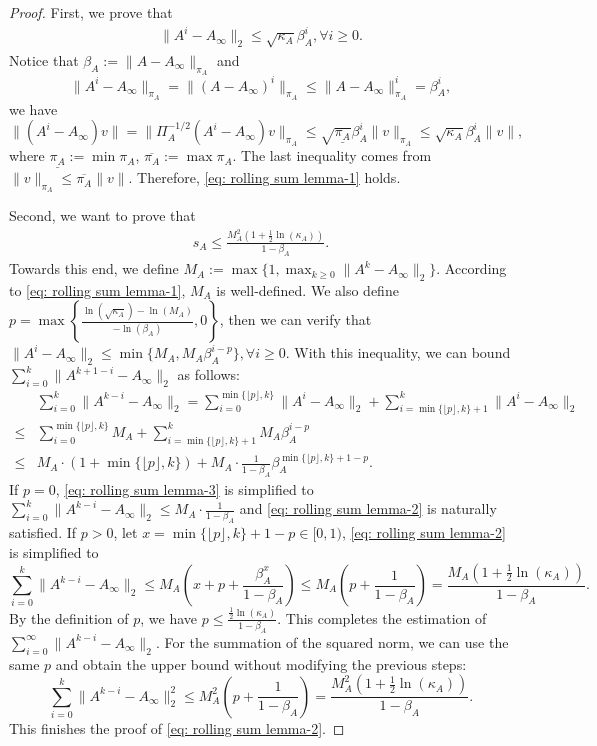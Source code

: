 \documentclass[10pt,a4paper]{amsart}
\newcommand{\norm}[1]{\| #1 \|}
\begin{document}
\begin{proof}
First, we prove that
\begin{align}\label{eq: rolling sum lemma-1}
    \norm{A^i-A_\infty}_2\le \sqrt{\kappa_A}\beta_A^{i}, \forall i \ge 0.
 \end{align}
Notice that $\beta_A:=\norm{A-A_\infty}_{\pi_A}$ and \[\norm{A^i-A_\infty}_{\pi_A}= \norm{(A-A_\infty)^i}_{\pi_A}\le \norm{A-A_\infty}^i_{\pi_A}=\beta_A^i,\]
we have
\[
\norm{(A^{i}-A_\infty)v}=\norm{\Pi_A^{-1/2}(A^i-A_\infty)v}_{\pi_A}\le \sqrt{\underline{\pi_A}}\beta_A^i\norm{v}_{\pi_A}\le \sqrt{\kappa_A}\beta_A^i\norm{v},
\]
where $\underline{\pi_A}:=\min \pi_A$, $\overline{\pi_A}:=\max \pi_A$.
The last inequality comes from $\norm{v}_{\pi_A}\le \overline{\pi_A} \norm{v}$. Therefore, \eqref{eq: rolling sum lemma-1} holds.

Second, we want to prove that
\begin{align}\label{eq: rolling sum lemma-2}
    s_A\le \frac{M_A^2(1+\frac{1}{2}\ln(\kappa_A))}{1-\beta_A}.
\end{align}
Towards this end, we define $M_A:=\max\{1, \max_{k\ge 0}\norm{A^k-A_\infty}_2 \}$. According to \eqref{eq: rolling sum lemma-1}, $M_A$ is well-defined. We also define $p=\max\left\{\frac{\ln(\sqrt{\kappa_A})-\ln(M_A)}{-\ln(\beta_A)}, 0\right\}$,
then we can verify that $\norm{A^i-A_\infty}_2\le \min\{M_A, M_A\beta_A^{i-p}\},\forall i\ge 0.$ With this inequality, we can bound $\sum_{i=0}^k\norm{A^{k+1-i}-A_\infty}_2$ as follows:
\begin{align}\label{eq: rolling sum lemma-3}
    &\sum_{i=0}^k\norm{A^{k-i}-A_\infty}_2=\sum_{i=0}^{\min\{\lfloor p \rfloor, k\}}\norm{A^i-A_\infty}_2+ \sum_{i=\min\{\lfloor p \rfloor, k\}+1}^{k}\norm{A^{i}-A_\infty}_2\\
    \le &\sum_{i=0}^{\min\{\lfloor p \rfloor, k\}} M_A+\sum_{i=\min\{\lfloor p \rfloor, k\}+1}^{k} M_A\beta_A^{i-p}\nonumber\\
    \le & M_A\cdot (1+\min\{\lfloor p \rfloor, k\})+M_A\cdot \frac{1}{1-\beta_A}\beta_A^{\min\{\lfloor p \rfloor, k\}+1-p}.\nonumber
\end{align}
If $p=0$, \eqref{eq: rolling sum lemma-3} is simplified to $\sum_{i=0}^k\norm{A^{k-i}-A_\infty}_2\le M_A\cdot\frac{1}{1-\beta_A}$ and \eqref{eq: rolling sum lemma-2} is naturally satisfied.
If $p>0$, let $x=\min\{\lfloor p \rfloor, k\}+1-p\in [0,1)$, \eqref{eq: rolling sum lemma-2} is simplified to
\[
\sum_{i=0}^k\norm{A^{k-i}-A_\infty}_2\le M_A\!\left(x+p+\frac{\beta_A^x}{1-\beta_A}\right)\le M_A\!\left(p+\frac{1}{1-\beta_A}\right)=\frac{M_A(1+\frac12 \ln(\kappa_A))}{1-\beta_A}.
\]
By the definition of $p$, we have $p\le \frac{\frac{1}{2}\ln(\kappa_A)}{1-\beta_A}$. This completes the estimation of $\sum_{i=0}^{\infty}\norm{A^{k-i}-A_\infty}_2$. For the summation of the squared norm, we can use the same $p$ and obtain the upper bound without modifying the previous steps:
\[
\sum_{i=0}^k\norm{A^{k-i}-A_\infty}_2^2\le M_A^2\!\left(p+\frac{1}{1-\beta_A}\right)=\frac{M_A^2(1+\frac12 \ln(\kappa_A))}{1-\beta_A}.
\]
This finishes the proof of \eqref{eq: rolling sum lemma-2}.


\end{proof}
\end{document}
